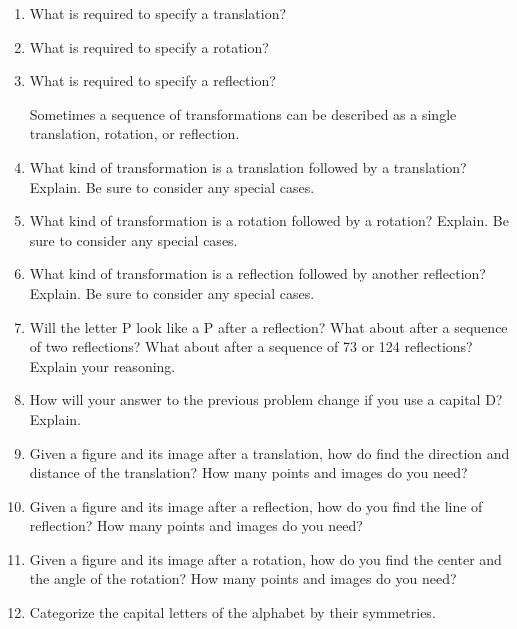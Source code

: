 %


\begin{problems}
\begin{enumerate}

\item What is required to specify a translation?  
\item What is required to specify a rotation? 
\item What is required to specify a reflection?  

Sometimes a sequence of transformations can be described as a single translation, rotation, or reflection.  

\item What kind of transformation is a translation followed by a translation?  Explain.  Be sure to consider any special cases.  
\item What kind of transformation is a rotation followed by a rotation?  Explain.  Be sure to consider any special cases.   
\item What kind of transformation is a reflection followed by another reflection?  Explain.  Be sure to consider any special cases.  

\item Will the letter P look like a P after a reflection?  What about after a sequence of two reflections?  What about after a sequence of 73 or 124 reflections?  Explain your reasoning.  

\item How will your answer to the previous problem change if you use a capital D?  Explain.  

\item Given a figure and its image after a translation, how do find the direction and distance of the translation?    How many points and images do you need?  
\item Given a figure and its image after a reflection, how do you find the line of reflection?  How many points and images do you need?  
\item Given a figure and its image after a rotation, how do you find the center and the angle of the rotation?  How many points and images do you need?  

\item Categorize the capital letters of the alphabet by their symmetries.  


\end{enumerate}
\end{problems}
